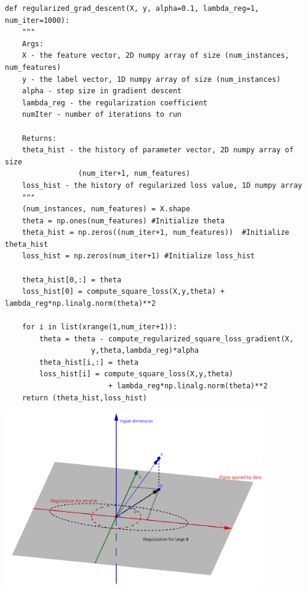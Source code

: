 \documentclass{article}
\newenvironment{sub}[2][$-$]{\begin{trivlist}
		\item[\hskip \labelsep {\bfseries #1}\hskip \labelsep {\bfseries #2.}]}  {\end{trivlist}}
\begin{document}
\begin{sub}{2.5.3}
\end{sub}

\begin{verbatim}
def regularized_grad_descent(X, y, alpha=0.1, lambda_reg=1, num_iter=1000):
	"""
	Args:
	X - the feature vector, 2D numpy array of size (num_instances, num_features)
	y - the label vector, 1D numpy array of size (num_instances)
	alpha - step size in gradient descent
	lambda_reg - the regularization coefficient
	numIter - number of iterations to run 
	
	Returns:
	theta_hist - the history of parameter vector, 2D numpy array of size
				 (num_iter+1, num_features) 
	loss_hist - the history of regularized loss value, 1D numpy array
	"""
	(num_instances, num_features) = X.shape
	theta = np.ones(num_features) #Initialize theta
	theta_hist = np.zeros((num_iter+1, num_features))  #Initialize theta_hist
	loss_hist = np.zeros(num_iter+1) #Initialize loss_hist
	
	theta_hist[0,:] = theta
	loss_hist[0] = compute_square_loss(X,y,theta) + lambda_reg*np.linalg.norm(theta)**2
	
	for i in list(xrange(1,num_iter+1)):
		theta = theta - compute_regularized_square_loss_gradient(X,
					y,theta,lambda_reg)*alpha
		theta_hist[i,:] = theta 
		loss_hist[i] = compute_square_loss(X,y,theta)
						+ lambda_reg*np.linalg.norm(theta)**2	
	return (theta_hist,loss_hist)    
\end{verbatim}

\pagebreak

\begin{sub}{2.5.4}
\end{sub}
\begin{center}
	\includegraphics[height = 3in]{2_5_3.png}
\end{center}
\end{document}
